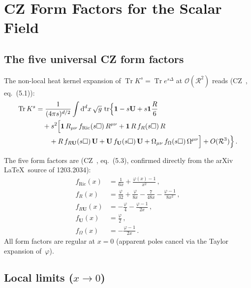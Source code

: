 \documentclass[11pt,a4paper]{article}
\newcommand{\Id}{\mathbf{1}}
\newcommand{\Tr}{\operatorname{Tr}}
\newcommand{\tr}{\operatorname{tr}}
\newcommand{\dd}{\mathrm{d}}
\theoremstyle{definition}
\theoremstyle{remark}
\begin{document}
\section{CZ Form Factors for the Scalar Field}
\label{sec:CZ}

\subsection{The five universal CZ form factors}

The non-local heat kernel expansion of
$\Tr K^s = \Tr e^{s\Delta}$ at $\mathcal{O}(\mathcal{R}^2)$ reads
(CZ~\cite{CZ2012}, eq.~(5.1)):
\begin{align}
  \Tr K^s &= \frac{1}{(4\pi s)^{d/2}}\int \dd^d x\,\sqrt{g}\,\tr\Bigl\{
    \Id - s\mathbf{U} + s\Id\frac{R}{6}
  \nonumber\\
  &\quad + s^2\Bigl[
    \Id\,R_{\mu\nu}\,f_{\text{Ric}}(s\Box)\,R^{\mu\nu}
    + \Id\,R\,f_R(s\Box)\,R
  \nonumber\\
  &\quad\quad
    + R\,f_{R\mathbf{U}}(s\Box)\,\mathbf{U}
    + \mathbf{U}\,f_{\mathbf{U}}(s\Box)\,\mathbf{U}
    + \Omega_{\mu\nu}\,f_\Omega(s\Box)\,\Omega^{\mu\nu}
  \Bigr] + O(\mathcal{R}^3)\Bigr\}\,.
  \label{eq:CZ-expansion}
\end{align}

The five form factors are (CZ~\cite{CZ2012}, eq.~(5.3),
confirmed directly from the arXiv \LaTeX\ source of 1203.2034):
\begin{align}
  f_{\text{Ric}}(x) &= \frac{1}{6x} + \frac{\varphi(x) - 1}{x^2}\,,
  \label{eq:f-Ric}\\[4pt]
  f_R(x) &= \frac{\varphi}{32} + \frac{\varphi}{8x}
    - \frac{7}{48x} - \frac{\varphi - 1}{8x^2}\,,
  \label{eq:f-R}\\[4pt]
  f_{R\mathbf{U}}(x) &= -\frac{\varphi}{4}
    - \frac{\varphi - 1}{2x}\,,
  \label{eq:f-RU}\\[4pt]
  f_{\mathbf{U}}(x) &= \frac{\varphi}{2}\,,
  \label{eq:f-U}\\[4pt]
  f_\Omega(x) &= -\frac{\varphi - 1}{2x}\,.
  \label{eq:f-Omega}
\end{align}
All form factors are regular at $x = 0$ (apparent poles cancel
via the Taylor expansion of~$\varphi$).

\subsection{Local limits ($x \to 0$)}
\label{sec:local-limits-CZ}
\end{document}
